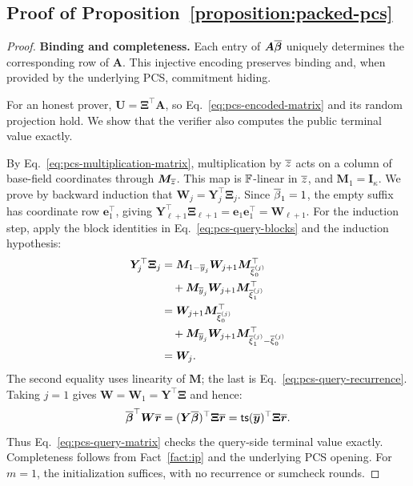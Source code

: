 \subsection{Proof of Proposition~\ref{proposition:packed-pcs}}
\label{appx:proof-pcs}

\begin{proof}
\noindent\textbf{Binding and completeness.}
Each entry of \(\bm A\overline{\bm\beta}\) uniquely determines
the corresponding row of \(\bm A\). This injective encoding
preserves binding and, when provided by the underlying PCS,
commitment hiding.

For an honest prover, \(\bm U=\bm\Xi^\top\bm A\), so
Eq.~\eqref{eq:pcs-encoded-matrix} and its random projection hold.
We show that the verifier also computes the public terminal value
exactly.

By Eq.~\eqref{eq:pcs-multiplication-matrix}, multiplication by
\(\overline{z}\) acts on a column of base-field coordinates through
\(\bm M_{\overline{z}}\). This map is \({\mathbb{F}}\)-linear in \(\overline{z}\),
and \(\bm M_{1}=\bm I_\kappa\).
We prove by backward induction that
\(\bm W_j=\bm Y_j^\top\bm\Xi_j\).
Since \(\overline{\beta}_1=1\), the empty suffix has coordinate row
\(\bm e_1^\top\), giving
\(\bm Y_{\ell+1}^\top\bm\Xi_{\ell+1}
=\bm e_1\bm e_1^\top=\bm W_{\ell+1}\).
For the induction step, apply the block identities in
Eq.~\eqref{eq:pcs-query-blocks} and the induction hypothesis:
\[
\begin{aligned}
    \bm Y_j^\top\bm\Xi_j
    &=\bm M_{1-\overline{y}_j}\bm W_{j+1}
        \bm M_{\overline{\xi}^{(j)}_0}^\top\\
    &\quad{}+\bm M_{\overline{y}_j}\bm W_{j+1}
        \bm M_{\overline{\xi}^{(j)}_1}^\top\\
    &=\bm W_{j+1}\bm M_{\overline{\xi}^{(j)}_0}^\top\\
    &\quad{}+\bm M_{\overline{y}_j}\bm W_{j+1}
        \bm M_{\overline{\xi}^{(j)}_1-\overline{\xi}^{(j)}_0}^\top\\
    &=\bm W_j.
\end{aligned}
\]
The second equality uses linearity of \(\bm M\); the last
is Eq.~\eqref{eq:pcs-query-recurrence}.
Taking \(j=1\) gives \(\bm W=\bm W_1=\bm Y^\top\bm\Xi\)
and hence:
\[
    \overline{\bm\beta}^\top\bm W\overline{\bm r}
    =(\bm Y\overline{\bm\beta})^\top\bm\Xi\overline{\bm r}
    ={\sf ts}(\overline{\bm y})^\top\bm\Xi\overline{\bm r}.
\]
Thus Eq.~\eqref{eq:pcs-query-matrix} checks the query-side
terminal value exactly. Completeness follows from
Fact~\ref{fact:ip} and the underlying PCS opening.
For \(m=1\), the initialization suffices, with no recurrence
or sumcheck rounds.


\end{proof}
